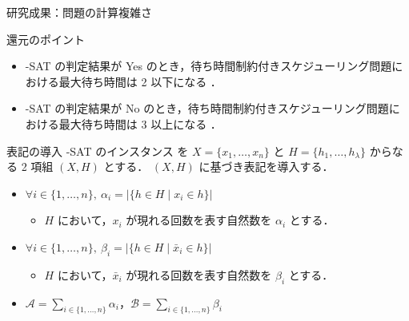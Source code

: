 \documentclass[dvipdfmx]{beamer}
\begin{document}
    \begin{frame}{研究成果：問題の計算複雑さ}
      \begin{block}{還元のポイント}
        \begin{itemize}
          \item {-SAT} の判定結果が \alert{Yes} のとき，待ち時間制約付きスケジューリング問題における最大待ち時間は \alert{2 以下}になる ．
          \item {-SAT} の判定結果が \alert{No} のとき，待ち時間制約付きスケジューリング問題における最大待ち時間は \alert{3 以上}になる ．
        \end{itemize}
      \end{block}
      \begin{block}{表記の導入}
        {-SAT} のインスタンス を $X = \{x_1,\ldots,x_n\}$ と $H = \{h_1,\ldots,h_{\lambda}\}$ からなる 2 項組 $(X,H)$ とする．
        $(X,H)$ に基づき表記を導入する．
        \begin{itemize}
          \item $\forall i \in \{1,\ldots,n\},~\alpha_i = |\{h \in H \mid x_i \in h\}|$
          \begin{itemize}
            \item $H$ において，$x_i$ が現れる回数を表す自然数を $\alpha_i$ とする．
          \end{itemize}
          \item $\forall i \in \{1,\ldots,n\},~\beta_i = |\{h \in H \mid \bar x_i \in h\}|$
          \begin{itemize}
            \item $H$ において，$\bar x_i$ が現れる回数を表す自然数を $\beta_i$ とする．
          \end{itemize}
          \item $\mathcal{A} = {\displaystyle \sum_{i \in \{1,\ldots,n\}}\alpha_i}$，$\mathcal{B} = {\displaystyle \sum_{i \in \{1,\ldots,n\}}\beta_i}$
        \end{itemize}
      \end{block}
    \end{frame}
\end{document}
